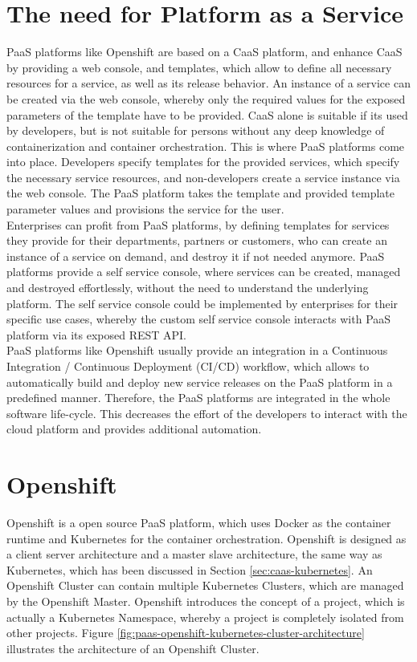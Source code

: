 \section{The need for Platform as a Service}
\label{sec:paas-need-for-paas}
PaaS platforms like Openshift are based on a CaaS platform, and enhance CaaS by providing a web console, and templates, which allow to define all necessary resources for a service, as well as its release behavior. An instance of a service can be created via the web console, whereby only the required values for the exposed parameters of the template have to be provided. CaaS alone is suitable if its used by developers, but is not suitable for persons without any deep knowledge of containerization and container orchestration. This is where PaaS platforms come into place. Developers specify templates for the provided services, which specify the necessary service resources, and non-developers create a service instance via the web console. The PaaS platform takes the template and provided template parameter values and provisions the service for the user. \\

Enterprises can profit from PaaS platforms, by defining templates for services they provide for their departments, partners or customers, who can create an instance of a service on demand, and destroy it if not needed anymore. PaaS platforms provide a self service console, where services can be created, managed and destroyed effortlessly, without the need to understand the underlying platform. The self service console could be implemented by enterprises for their specific use cases, whereby the custom self service console interacts with PaaS platform via its exposed REST API. \\

PaaS platforms like Openshift usually provide an integration in a Continuous Integration / Continuous Deployment (CI/CD) workflow, which allows to automatically build and deploy new service releases on the PaaS platform in a predefined manner. Therefore, the PaaS platforms are integrated in the whole software life-cycle. This decreases the effort of the developers to interact with the cloud platform and provides additional automation.
 
\section{Openshift}
\label{sec:paas-openshift}
Openshift is a open source PaaS platform, which uses Docker as the container runtime and Kubernetes for the container orchestration. Openshift is designed as a client server architecture and a master slave architecture, the same way as Kubernetes, which has been discussed in Section \vref{sec:caas-kubernetes}. An Openshift Cluster can contain multiple Kubernetes Clusters, which are managed by the Openshift Master. Openshift introduces the concept of a project, which is actually a Kubernetes Namespace, whereby a project is completely isolated from other projects. Figure \vref{fig:paas-openshift-kubernetes-cluster-architecture} illustrates the architecture of an Openshift Cluster\cite{OpenshiftDeepDive2014, OpenshiftCoreConcepts2018}.

